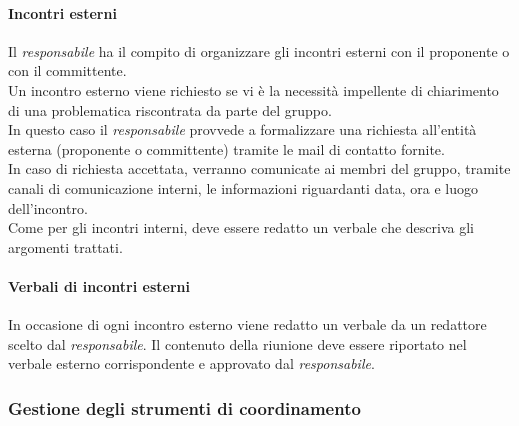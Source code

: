       \paragraph{Incontri esterni}
        Il \textit{responsabile} ha il compito di organizzare gli incontri esterni con il proponente o con il committente.\\
        Un incontro esterno viene richiesto se vi è la necessità impellente di chiarimento di una problematica riscontrata da parte del gruppo.\\
        In questo caso il \textit{responsabile} provvede a formalizzare una richiesta all’entità esterna (proponente o committente) tramite le mail di contatto fornite.\\
        In caso di richiesta accettata, verranno comunicate ai membri del gruppo, tramite canali di comunicazione interni, le informazioni riguardanti data, ora e luogo dell’incontro.\\
        Come per gli incontri interni, deve essere redatto un verbale che descriva gli argomenti trattati.
      \paragraph {Verbali di incontri esterni}
      In occasione di ogni incontro esterno viene redatto un verbale da un redattore scelto dal \textit{responsabile}. Il contenuto della riunione deve essere riportato nel verbale esterno corrispondente e approvato dal \textit{responsabile}.

    \subsubsection{Gestione degli strumenti di coordinamento}
